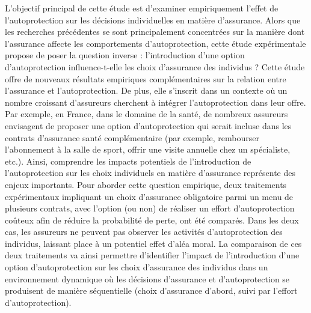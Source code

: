 \begin{Article}
\begin{refsection}[Mouminoux]
L'objectif principal de cette étude est d'examiner empiriquement l'effet de l'autoprotection sur les décisions individuelles en matière d'assurance. Alors que les recherches précédentes se sont principalement concentrées sur la manière dont l'assurance affecte les comportements d'autoprotection, cette étude expérimentale propose de poser la question inverse : l'introduction d'une option d'autoprotection influence-t-elle les choix d'assurance des individus ? Cette étude offre de nouveaux résultats empiriques complémentaires sur la relation entre l'assurance et l'autoprotection. De plus, elle s'inscrit dans un contexte où un nombre croissant d'assureurs cherchent à intégrer l'autoprotection dans leur offre. Par exemple, en France, dans le domaine de la santé, de nombreux assureurs envisagent de proposer une option d'autoprotection qui serait incluse dans les contrats d'assurance santé complémentaire (par exemple, rembourser l'abonnement à la salle de sport, offrir une visite annuelle chez un spécialiste, etc.). Ainsi, comprendre les impacts potentiels de l'introduction de l'autoprotection sur les choix individuels en matière d'assurance représente des enjeux importants. Pour aborder cette question empirique, deux traitements expérimentaux impliquant un choix d'assurance obligatoire parmi un menu de plusieurs contrats, avec l'option (ou non) de réaliser un effort d'autoprotection coûteux afin de réduire la probabilité de perte, ont été comparés. Dans les deux cas, les assureurs ne peuvent pas observer les activités d'autoprotection des individus, laissant place à un potentiel effet d'aléa moral. La comparaison de ces deux traitements va ainsi permettre d'identifier l'impact de l'introduction d'une option d'autoprotection sur les choix d'assurance des individus dans un environnement dynamique où les décisions d'assurance et d'autoprotection se produisent de manière séquentielle (choix d'assurance d'abord, suivi par l'effort d'autoprotection).


\end{refsection}
\end{Article}
